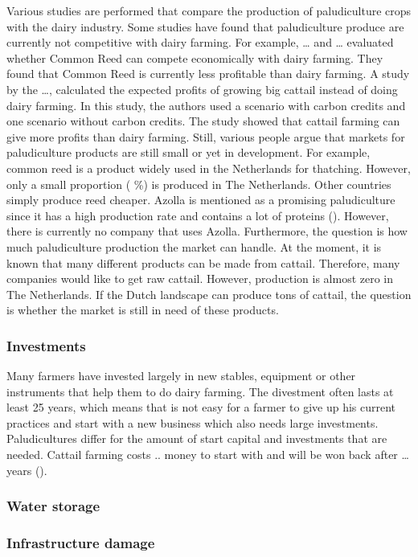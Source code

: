 \documentclass[12pt,a4paper,titlepage]{article}
\begin{document}
Various studies are performed that compare the production of paludiculture crops with the dairy industry. Some studies have found that paludiculture produce are currently not competitive with  dairy farming. For example, … and … evaluated whether Common Reed can compete economically with dairy farming. They found that Common Reed is currently less profitable than dairy farming. A study by the …, calculated the expected profits of growing big cattail instead of doing dairy farming. In this study, the authors used a scenario with carbon credits and one scenario without carbon credits. The study showed that cattail farming can give more profits than dairy farming. Still, various people argue that markets for paludiculture products are still small or yet in development. For example, common reed is a product widely used in the Netherlands for thatching. However, only a small proportion ( \%) is produced in The Netherlands. Other countries simply produce reed cheaper. Azolla is mentioned as a promising paludiculture since it has a high production rate and contains a lot of proteins (). However, there is currently no company that uses Azolla. Furthermore, the question is how much paludiculture production the market can handle. At the moment, it is known that many different products can be made from cattail. Therefore, many companies would like to get raw cattail. However, production is almost zero in The Netherlands. If the Dutch landscape can produce tons of cattail, the question is whether the market is still in need of these products. 

\subsubsection{Investments}

Many farmers have invested largely in new stables, equipment or other instruments that help them to do dairy farming. The divestment often lasts at least 25 years, which means that is not easy for a farmer to give up his current practices and start with a new business which also needs large investments. Paludicultures differ for the amount of start capital and investments that are needed. Cattail farming costs .. money to start with and will be won back after … years ().

\subsubsection{Water storage}

\subsubsection{Infrastructure damage}
\end{document}
